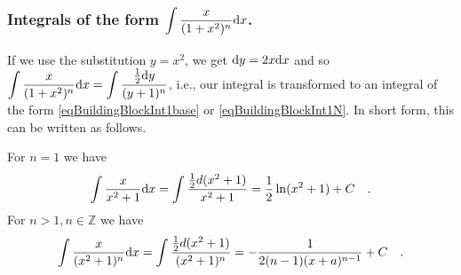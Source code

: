 \documentclass[12pt]{book}
\begin{document}
\subsubsection{Integrals of the form $\displaystyle\int \frac{x}{(1+x ^2)^n} {\normalfont \text{d}} x $.}
If we use the substitution $y=x^2$, we get ${\normalfont \text{d}} y=2x{\normalfont \text{d}} x $ and so $\displaystyle\int \frac{x}{(1+x ^2)^n} {\normalfont \text{d}} x = \displaystyle\int \frac{\frac12 {\normalfont \text{d}} y}{(y+1)^n} $, i.e., our integral is transformed to an integral of the form \eqref{eqBuildingBlockInt1base} or  \eqref{eqBuildingBlockInt1N}. In short form, this can be written as follows.

For $n=1$ we have
\[
\int \frac{x}{x^2+1}{\normalfont \text{d}} x= \int \frac{\frac{1}2 d(x^2+1)}{x^2+1}= \frac{1}{2}\ln (x^2+1) +C\quad .
\]
For $n>1, n\in \mathbb Z$ we have
\[
\int \frac{x}{(x^2+1)^n}{\normalfont \text{d}} x= \int \frac{\frac{1}2d(x^2+1)}{(x^2+1)^n}= -\frac{1}{2(n-1)(x+a)^{n-1} } +C\quad .
\]
\end{document}
